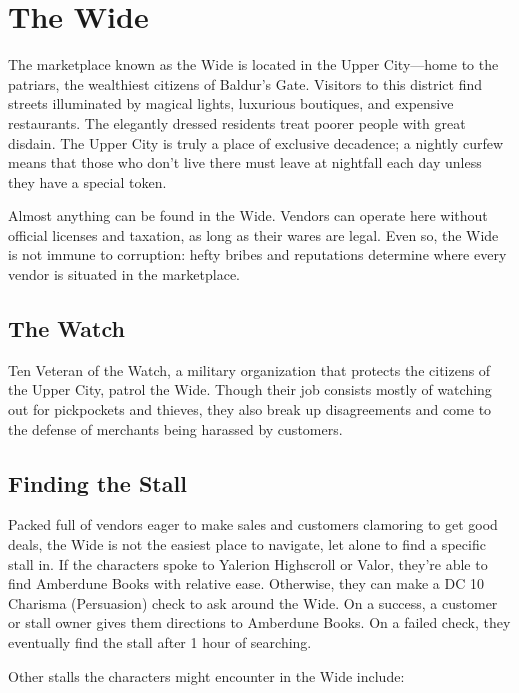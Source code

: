 \documentclass[10pt,a4paper,twoside,bg=print,twocolumn,openany,nodeprecatedcode]{dndbook}
\begin{document}
\section{The Wide}
The marketplace known as the Wide is located in the Upper City—home to the patriars, the wealthiest citizens of Baldur's Gate. Visitors to this district find streets illuminated by magical lights, luxurious boutiques, and expensive restaurants. The elegantly dressed residents treat poorer people with great disdain. The Upper City is truly a place of exclusive decadence; a nightly curfew means that those who don't live there must leave at nightfall each day unless they have a special token.

Almost anything can be found in the Wide. Vendors can operate here without official licenses and taxation, as long as their wares are legal. Even so, the Wide is not immune to corruption: hefty bribes and reputations determine where every vendor is situated in the marketplace.

\subsection{The Watch}
Ten Veteran of the Watch, a military organization that protects the citizens of the Upper City, patrol the Wide. Though their job consists mostly of watching out for pickpockets and thieves, they also break up disagreements and come to the defense of merchants being harassed by customers.

\subsection{Finding the Stall}
Packed full of vendors eager to make sales and customers clamoring to get good deals, the Wide is not the easiest place to navigate, let alone to find a specific stall in. If the characters spoke to Yalerion Highscroll or Valor, they're able to find Amberdune Books with relative ease. Otherwise, they can make a DC 10 Charisma (Persuasion) check to ask around the Wide. On a success, a customer or stall owner gives them directions to Amberdune Books. On a failed check, they eventually find the stall after 1 hour of searching.

Other stalls the characters might encounter in the Wide include:
\end{document}
